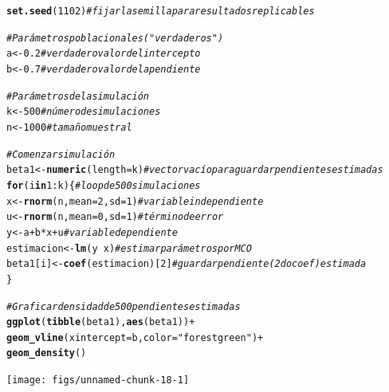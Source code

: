 \documentclass[12pt]{report}\usepackage[]{graphicx}\usepackage[]{color}
\makeatletter
\newcommand{\hlnum}[1]{\textcolor[rgb]{0.686,0.059,0.569}{#1}}%
\newcommand{\hlstr}[1]{\textcolor[rgb]{0.192,0.494,0.8}{#1}}%
\newcommand{\hlcom}[1]{\textcolor[rgb]{0.678,0.584,0.686}{\textit{#1}}}%
\newcommand{\hlopt}[1]{\textcolor[rgb]{0,0,0}{#1}}%
\newcommand{\hlstd}[1]{\textcolor[rgb]{0.345,0.345,0.345}{#1}}%
\newcommand{\hlkwa}[1]{\textcolor[rgb]{0.161,0.373,0.58}{\textbf{#1}}}%
\newcommand{\hlkwb}[1]{\textcolor[rgb]{0.69,0.353,0.396}{#1}}%
\newcommand{\hlkwc}[1]{\textcolor[rgb]{0.333,0.667,0.333}{#1}}%
\newcommand{\hlkwd}[1]{\textcolor[rgb]{0.737,0.353,0.396}{\textbf{#1}}}%
\newenvironment{kframe}{%
 \def\at@end@of@kframe{}%
 \ifinner\ifhmode%
  \def\at@end@of@kframe{\end{minipage}}%
  \begin{minipage}{\columnwidth}%
 \fi\fi%
 \def\FrameCommand##1{\hskip\@totalleftmargin \hskip-\fboxsep
 \colorbox{shadecolor}{##1}\hskip-\fboxsep
     \hskip-\linewidth \hskip-\@totalleftmargin \hskip\columnwidth}%
 \MakeFramed {\advance\hsize-\width
   \@totalleftmargin\z@ \linewidth\hsize
   \@setminipage}}%
 {\par\unskip\endMakeFramed%
 \at@end@of@kframe}
\newenvironment{knitrout}{}{} %
\makeatother
\begin{document}
\begin{knitrout}
\color{fgcolor}\begin{kframe}
\begin{alltt}
\hlkwd{set.seed}\hlstd{(}\hlnum{1102}\hlstd{)} \hlcom{# fijar la semilla para resultados replicables}

\hlcom{# Parámetros poblacionales ("verdaderos")}
\hlstd{a} \hlkwb{<-} \hlnum{0.2} \hlcom{# verdadero valor del intercepto}
\hlstd{b} \hlkwb{<-} \hlnum{0.7} \hlcom{# verdadero valor de la pendiente}

\hlcom{# Parámetros de la simulación}
\hlstd{k} \hlkwb{<-} \hlnum{500} \hlcom{# número de simulaciones }
\hlstd{n} \hlkwb{<-} \hlnum{1000} \hlcom{# tamaño muestral}

\hlcom{# Comenzar simulación}
\hlstd{beta1} \hlkwb{<-} \hlkwd{numeric}\hlstd{(}\hlkwc{length} \hlstd{= k)} \hlcom{# vector vacío para guardar pendientes estimadas}
\hlkwa{for}\hlstd{(i} \hlkwa{in} \hlnum{1}\hlopt{:}\hlstd{k) \{} \hlcom{# loop de 500 simulaciones}
  \hlstd{x} \hlkwb{<-} \hlkwd{rnorm}\hlstd{(n,} \hlkwc{mean}\hlstd{=}\hlnum{2}\hlstd{,} \hlkwc{sd}\hlstd{=}\hlnum{1}\hlstd{)} \hlcom{# variable independiente}
  \hlstd{u} \hlkwb{<-} \hlkwd{rnorm}\hlstd{(n,} \hlkwc{mean}\hlstd{=}\hlnum{0}\hlstd{,} \hlkwc{sd}\hlstd{=}\hlnum{1}\hlstd{)} \hlcom{# término de error}
  \hlstd{y} \hlkwb{<-} \hlstd{a} \hlopt{+} \hlstd{b}\hlopt{*}\hlstd{x} \hlopt{+} \hlstd{u} \hlcom{# variable dependiente}
  \hlstd{estimacion} \hlkwb{<-} \hlkwd{lm}\hlstd{(y} \hlopt{~} \hlstd{x)} \hlcom{# estimar parámetros por MCO}
  \hlstd{beta1[i]} \hlkwb{<-} \hlkwd{coef}\hlstd{(estimacion)[}\hlnum{2}\hlstd{]} \hlcom{# guardar pendiente (2do coef) estimada}
\hlstd{\}}

\hlcom{# Graficar densidad de 500 pendientes estimadas}
\hlkwd{ggplot}\hlstd{(}\hlkwd{tibble}\hlstd{(beta1),} \hlkwd{aes}\hlstd{(beta1))} \hlopt{+}
  \hlkwd{geom_vline}\hlstd{(}\hlkwc{xintercept} \hlstd{= b,} \hlkwc{color} \hlstd{=} \hlstr{"forestgreen"}\hlstd{)} \hlopt{+}
  \hlkwd{geom_density}\hlstd{()}
\end{alltt}
\end{kframe}

{\centering \texttt{[image: figs/unnamed-chunk-18-1]} 

}



\end{knitrout}
\end{document}
